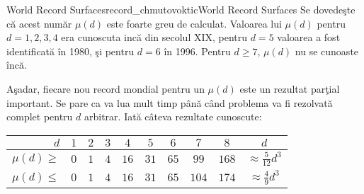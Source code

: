 \begin{surferIntroPage}{World Record Surfaces}{record_chmutovoktic}{World Record Surfaces}
   Se dovede\c{s}te c\u{a} acest num\u{a}r $\mu(d)$ este foarte greu de calculat.
   Valoarea lui $\mu(d)$ pentru $d=1,2,3,4$ era cunoscuta inc\u{a} din secolul XIX,
   pentru $d=5$ valoarea a fost identificat\u{a} \^{i}n 1980, \c{s}i pentru $d=6$ \^{i}n 1996.
   Pentru $d\ge 7$, $\mu(d)$ nu se cunoaste \^{i}nc\u{a}.
   
   A\c{s}adar, fiecare nou record mondial pentru un $\mu(d)$ este un rezultat par\c{t}ial important.
   Se pare ca va lua mult timp p\^{a}n\u{a} c\^{a}nd problema va fi rezolvat\u{a} complet pentru $d$ 
   arbitrar. Iat\u{a} c\^{a}teva rezultate cunoscute:
    
   \begin{center}
      \begin{tabular}{r|cccccccc|c}
        $d$ & $1$ & $2$ & $3$ & $4$ & $5$ & $6$ & $7$ & $8$ & $d$\\
        \hline
        \hline
        \rule{0pt}{1.2em}$\mu(d)\ge$ & $0$ & $1$ & $4$ & $16$ & $31$ & $65$ &
        $99$ & $168$ & 
        $\approx \frac{5}{12}d^3$\\[0.3em]
        \hline
        \rule{0pt}{1.2em}$\mu(d)\le$ & $0$ & $1$ & $4$ & $16$ & $31$ & $65$ &
        $104$ & $174$ & $\approx \frac{4}{9}d^3$
      \end{tabular}
    \end{center}
\end{surferIntroPage}
